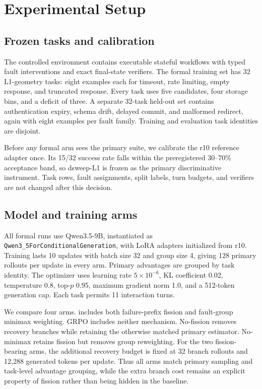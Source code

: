 \section{Experimental Setup}
\label{sec:experimental-setup}

\subsection{Frozen tasks and calibration}

The controlled environment contains executable stateful workflows with typed
fault interventions and exact final-state verifiers.  The formal training set
has 32 L1-geometry tasks: eight examples each for timeout, rate limiting,
empty response, and truncated response.  Every task uses five candidates,
four storage bins, and a deficit of three.  A separate 32-task held-out set
contains authentication expiry, schema drift, delayed commit, and malformed
redirect, again with eight examples per fault family.  Training and
evaluation task identities are disjoint.

Before any formal arm sees the primary suite, we calibrate the r10 reference
adapter once.  Its 15/32 success rate falls within the preregistered
30--70\% acceptance band, so dsweep-L1 is frozen as the primary
discriminative instrument.  Task rows, fault assignments, split labels,
turn budgets, and verifiers are not changed after this decision.

\subsection{Model and training arms}

All formal runs use Qwen3.5-9B, instantiated as
\texttt{Qwen3\_5ForConditionalGeneration}, with LoRA adapters initialized
from r10.  Training lasts 10 updates with batch size 32 and group size 4,
giving 128 primary rollouts per update in every arm.  Primary advantages are
grouped by task identity.  The optimizer uses learning rate $5\times10^{-6}$,
KL coefficient 0.02, temperature 0.8, top-$p$ 0.95, maximum gradient norm
1.0, and a 512-token generation cap.  Each task permits 11 interaction turns.

We compare four arms.  \method{} includes both failure-prefix fission and
fault-group minimax weighting.  GRPO includes neither mechanism.
No-fission removes recovery branches while retaining the otherwise matched
primary estimator.  No-minimax retains fission but removes group
reweighting.  For the two fission-bearing arms, the additional recovery
budget is fixed at 32 branch rollouts and 12,288 generated tokens per update.
Thus all arms match primary sampling and task-level advantage grouping, while
the extra branch cost remains an explicit property of fission rather than
being hidden in the baseline.

